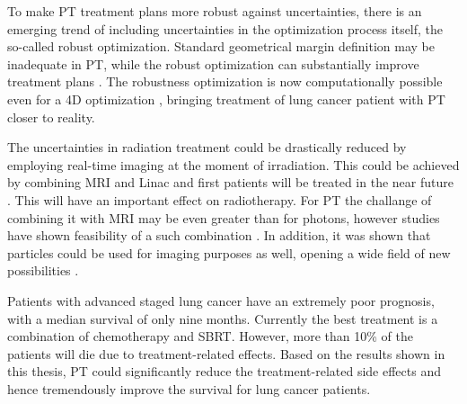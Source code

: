 \documentclass[type=dr, dr=rernat, accentcolor=tud7b,colorbacktitle, bigchapter, openright, twoside, 12pt ]{tudthesis}
\begin{document}
To make PT treatment plans more robust against uncertainties, there is an emerging trend of including uncertainties in the optimization process itself, the so-called robust optimization.
Standard geometrical margin definition may be inadequate in PT, while the robust optimization can substantially improve treatment plans \cite{Chen2012}. 
The robustness optimization is now computationally possible even for a 4D optimization \cite{Liu2016}, bringing treatment of lung cancer patient with PT closer to reality.


The uncertainties in radiation treatment could be drastically reduced by employing real-time imaging at the moment of irradiation.
This could be achieved by combining MRI and Linac and first patients will be treated in the near future \cite{Lagendijk2016}. This will have an important effect on radiotherapy.
For PT the challange of combining it with MRI may be even greater than for photons, however studies have shown feasibility of a such combination \cite{Hartman2015}.
In addition, it was shown that particles could be used for imaging purposes as well, opening a wide
field of new possibilities \cite{Prall2016}.

Patients with advanced staged lung cancer have an extremely poor prognosis, with a median survival of only nine months. 
Currently the best treatment is a combination of chemotherapy and SBRT. However, more than 10\% of the patients will die due to 
treatment-related effects. Based on the results shown in this thesis, PT could significantly reduce the 
treatment-related side effects and hence tremendously improve the survival for lung cancer patients.
\end{document}
